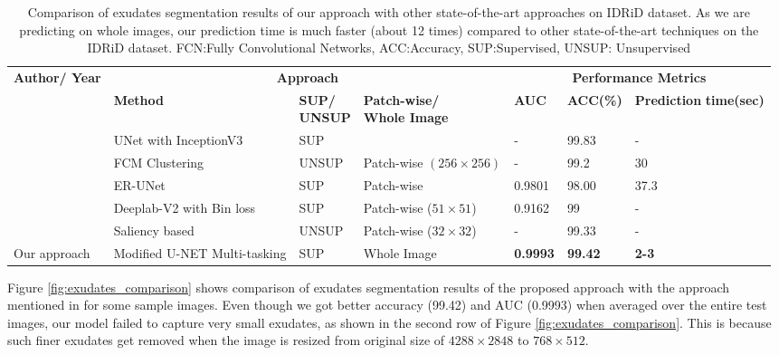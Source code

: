 \documentclass[utf8]{FrontiersinHarvard} %
\begin{document}
\begin{table}[!h]
\centering
\caption{Comparison of exudates segmentation results of our approach with other state-of-the-art approaches on IDRiD dataset. As we are predicting on whole images, our prediction time is much faster (about 12 times) compared to other state-of-the-art techniques on the IDRiD dataset. FCN:Fully Convolutional Networks, ACC:Accuracy, SUP:Supervised, UNSUP: Unsupervised}
\label{tab:result_comparison_ex}
\vspace{2mm}
\begin{tabular}{|p{2.5cm}|p{3.3cm}|p{1.4cm}|p{2.4cm}|p{1.2cm}|p{1.5cm}|p{2cm}|}
\hline
\textbf{Author/ Year} &  \multicolumn{3}{|c|}{\textbf{Approach}}   & \multicolumn{3}{|c|}{\textbf{Performance Metrics}}  \\
\cline{2-7}
&\textbf{Method} &\textbf{SUP/ \newline UNSUP} &   \textbf{Patch-wise/ \newline Whole Image} &\textbf{AUC} & \textbf{ACC(\%)} & \textbf{Prediction} \newline \textbf{time(sec)}\\
\hline
%
\cite{kaur2022uniconv}  & UNet with \newline InceptionV3 & SUP & &  - & 99.83 & - \\
\hline
\cite{hamad2020exudates}  & FCM Clustering & UNSUP & Patch-wise \newline $(256 \times 256)$  & -  & 99.2 & 30 \\
\hline

\cite{kou2020enhanced}  & ER-UNet &SUP& Patch-wise &   0.9801 & 98.00 & 37.3 \\
\hline
\cite{guo2020bin}  &  Deeplab-V2 \newline with Bin loss &SUP& Patch-wise \newline ($51\times51$) & 0.9162 & 99 & - \\
\hline
\cite{nur2018exudate}  & Saliency based & UNSUP& Patch-wise \newline ($32\times32$) & - & 99.33 & - \\
\hline
Our approach & Modified U-NET \newline Multi-tasking & SUP & Whole Image & \textbf{0.9993} & \textbf{99.42} & \textbf{2-3} \\

\hline
\end{tabular}
\end{table}

Figure \ref{fig:exudates_comparison} shows comparison of exudates segmentation results of the proposed approach with the approach mentioned in \cite{guo2020bin} for some sample images. Even though we got better  accuracy (99.42) and AUC (0.9993) when averaged over the entire test images, our model failed to capture very small exudates, as shown in the second row of Figure \ref{fig:exudates_comparison}. This is because such finer exudates get removed when the image is resized from original size of $4288 \times 2848$ to $768 \times 512$.
\end{document}
